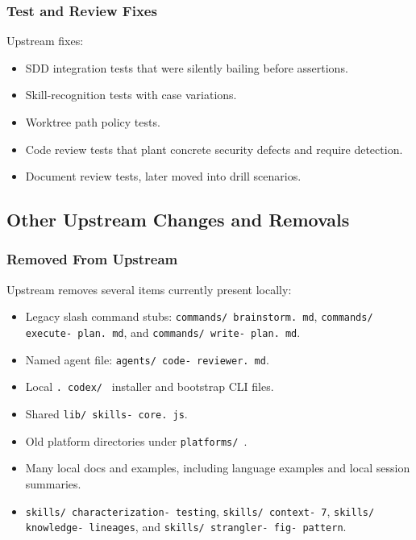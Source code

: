\documentclass[twocolumn,10pt,letterpaper]{article}
\begin{document}
\subsubsection{Test and Review Fixes}

Upstream fixes:


\begin{itemize}
\setlength{\itemsep}{0pt}
\setlength{\parskip}{0pt}
  \item SDD integration tests that were silently bailing before assertions.
  \item Skill-recognition tests with case variations.
  \item Worktree path policy tests.
  \item Code review tests that plant concrete security defects and require detection.
  \item Document review tests, later moved into drill scenarios.
\end{itemize}

\subsection{Other Upstream Changes and Removals}

\subsubsection{Removed From Upstream}

Upstream removes several items currently present locally:


\begin{itemize}
\setlength{\itemsep}{0pt}
\setlength{\parskip}{0pt}
  \item Legacy slash command stubs: \texttt{commands/ brainstorm. md}, \texttt{commands/ execute- plan. md}, and \texttt{commands/ write- plan. md}.
  \item Named agent file: \texttt{agents/ code- reviewer. md}.
  \item Local \texttt{. codex/ } installer and bootstrap CLI files.
  \item Shared \texttt{lib/ skills- core. js}.
  \item Old platform directories under \texttt{platforms/ }.
  \item Many local docs and examples, including language examples and local session summaries.
  \item \texttt{skills/ characterization- testing}, \texttt{skills/ context- 7}, \texttt{skills/ knowledge- lineages}, and \texttt{skills/ strangler- fig- pattern}.
\end{itemize}
\end{document}
